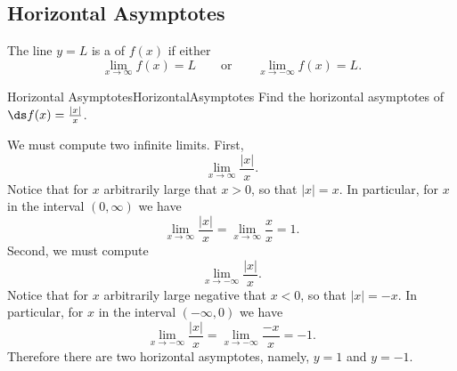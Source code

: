 \subsection{Horizontal Asymptotes}\label{subsec:HorizontalAsymptotes}
The line $y=L$ is a  of $f(x)$ if either
$$\lim_{x\to\infty}f(x)=L\qquad\mbox{or}\qquad\lim_{x\to-\infty}f(x)=L.$$

\begin{example}{Horizontal Asymptotes}{HorizontalAsymptotes}
Find the horizontal asymptotes of $\ds f(x)=\frac{|x|}{x}$.
\end{example}

\begin{solution} 
We must compute two infinite limits.
First,
$$\lim_{x\to\infty}\frac{|x|}{x}.$$
Notice that for $x$ arbitrarily large that $x>0$, so that $|x|=x$.
In particular, for $x$ in the interval $(0,\infty)$ we have
$$\lim_{x\to\infty}\frac{|x|}{x}=\lim_{x\to\infty}\frac{x}{x}=1.$$
Second, we must compute
$$\lim_{x\to-\infty}\frac{|x|}{x}.$$
Notice that for $x$ arbitrarily large negative that $x<0$, so that $|x|=-x$.
In particular, for $x$ in the interval $(-\infty,0)$ we have
$$\lim_{x\to -\infty}\frac{|x|}{x}=\lim_{x\to -\infty}\frac{-x}{x}=-1.$$
Therefore there are two horizontal asymptotes, namely, $y=1$ and $y=-1$.
\end{solution}